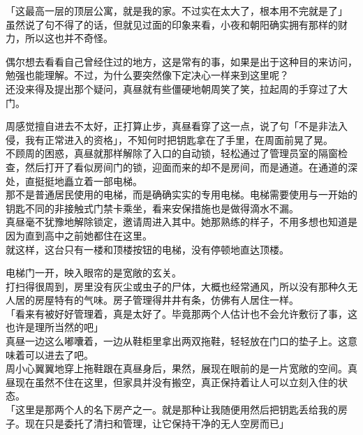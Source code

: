 「这最高一层的顶层公寓，就是我的家。不过实在太大了，根本用不完就是了」\\

虽然说了句不得了的话，但就见过面的印象来看，小夜和朝阳确实拥有那样的财力，所以这也并不奇怪。

偶尔想去看看自己曾经住过的地方，这是常有的事，如果是出于这种目的来访问，勉强也能理解。不过，为什么要突然像下定决心一样来到这里呢？\\

还没来得及提出那个疑问，真昼就有些僵硬地朝周笑了笑，拉起周的手穿过了大门。

周感觉擅自进去不太好，正打算止步，真昼看穿了这一点，说了句「不是非法入侵，我有正常进入的资格」，不知何时把钥匙拿在了手里，在周面前晃了晃。\\

不顾周的困惑，真昼就那样解除了入口的自动锁，轻松通过了管理员室的隔窗检查，然后打开了看似房间门的锁，迎面而来的却不是房间，而是通道。在通道的深处，直挺挺地矗立着一部电梯。\\

那不是普通居民使用的电梯，而是确确实实的专用电梯。电梯需要使用与一开始的钥匙不同的非接触式门禁卡乘坐，看来安保措施也是做得滴水不漏。\\

真昼毫不犹豫地解除锁定，邀请周进入其中。她那熟练的样子，不用多想也知道是因为直到高中之前她都住在这里。\\

就这样，这台只有一楼和顶楼按钮的电梯，没有停顿地直达顶楼。

电梯门一开，映入眼帘的是宽敞的玄关。\\

打扫得很周到，房里没有灰尘或虫子的尸体，大概也经常通风，所以没有那种久无人居的房屋特有的气味。房子管理得井井有条，仿佛有人居住一样。\\

「看来有被好好管理着，真是太好了。毕竟那两个人估计也不会允许敷衍了事，这也许是理所当然的吧」\\

真昼一边这么嘟囔着，一边从鞋柜里拿出两双拖鞋，轻轻放在门口的垫子上。这意味着可以进去了吧。\\

周小心翼翼地穿上拖鞋跟在真昼身后，果然，展现在眼前的是一片宽敞的空间。真昼现在虽然不住在这里，但家具并没有搬空，真正保持着让人可以立刻入住的状态。\\

「这里是那两个人的名下房产之一。就是那种让我随便用然后把钥匙丢给我的房子。现在只是委托了清扫和管理，让它保持干净的无人空房而已」\\

